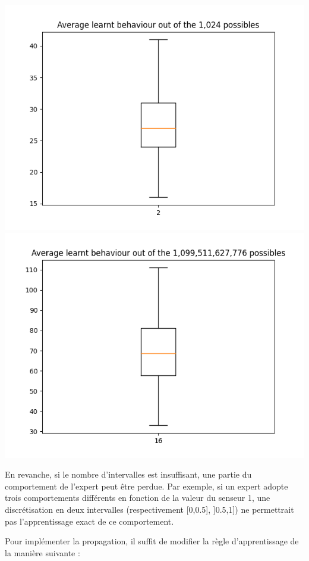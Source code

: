 \documentclass[a4paper, 12pt]{report}
\begin{document}
\includegraphics[scale = 0.5]{averageLearntBehaviourD2}
\includegraphics[scale = 0.5]{averageLearntBehaviourD16}
	
	En revanche, si le nombre d'intervalles est insuffisant, une partie du comportement de l'expert peut être perdue. Par exemple, si un expert adopte trois comportements différents en fonction de la valeur du senseur 1, une discrétisation en deux intervalles (respectivement [0,0.5], ]0.5,1]) ne permettrait pas l'apprentissage exact de ce comportement.
	
	Pour implémenter la propagation, il suffit de modifier la règle d'apprentissage de la manière suivante :
	
	
\end{document}
